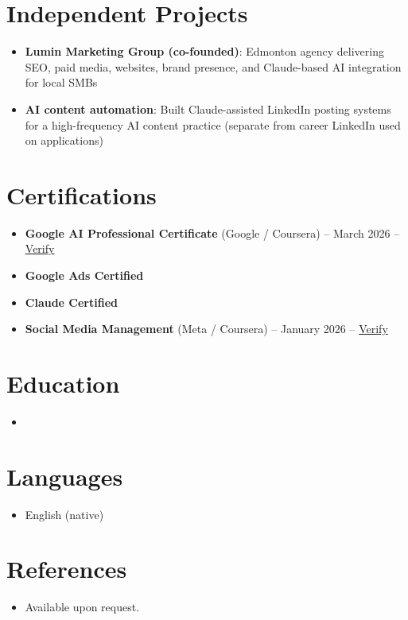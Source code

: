 \documentclass[11pt,a4paper,sans]{moderncv}
\begin{document}
\section{Independent Projects}
\vspace{1pt}
\begin{itemize}
\item \textbf{Lumin Marketing Group (co-founded)}: Edmonton agency delivering SEO, paid media, websites, brand presence, and Claude-based AI integration for local SMBs
\item \textbf{AI content automation}: Built Claude-assisted LinkedIn posting systems for a high-frequency AI content practice (separate from career LinkedIn used on applications)
\end{itemize}

\section{Certifications}
\vspace{1pt}
\begin{itemize}
\item \textbf{Google AI Professional Certificate} (Google / Coursera) -- March 2026 -- \href{https://www.coursera.org/account/accomplishments/verify/professional-cert/54E1P3RBHVL8}{Verify}
\item \textbf{Google Ads Certified}
\item \textbf{Claude Certified}
\item \textbf{Social Media Management} (Meta / Coursera) -- January 2026 -- \href{https://www.coursera.org/account/accomplishments/verify/7NOVGMU2L69G}{Verify}
\end{itemize}

\section{Education}
\vspace{1pt}
\begin{itemize}
\item{}
\end{itemize}

\section{Languages}
\vspace{1pt}
\begin{itemize}
\item English (native)
\end{itemize}

\section{References}
\vspace{1pt}
\begin{itemize}
\item{Available upon request.}
\end{itemize}
\end{document}
